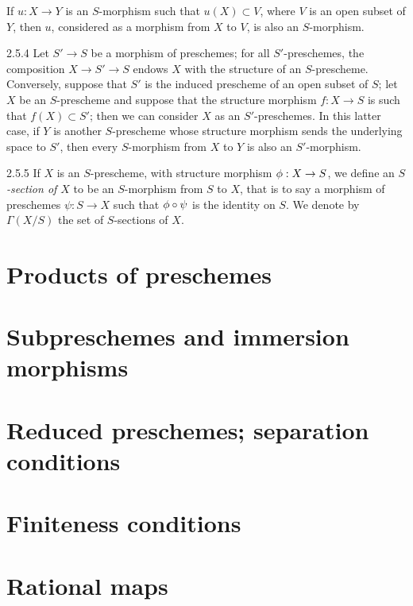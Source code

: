 If $u:X\to Y$ is an $S$-morphism such that $u(X)\subset V$, where $V$ is
an open subset of $Y$, then $u$, considered as a morphism from $X$ to $V$, is
also an $S$-morphism.

\begin{env}{2.5.4}
\label{env-1.2.5.4}
Let $S'\to S$ be a morphism of preschemes; for all
$S'$-preschemes, the composition $X\to S'\to S$ endows $X$ with the structure of
an $S$-prescheme. Conversely, suppose that $S'$ is the induced prescheme of an
open subset of $S$; let $X$ be an $S$-prescheme and suppose that the structure
morphism $f:X\to S$ is such that $f(X)\subset S'$; then we can consider
$X$ as an $S'$-preschemes. In this latter case, if $Y$ is another $S$-prescheme
whose structure morphism sends the underlying space to $S'$, then every
$S$-morphism from $X$ to $Y$ is also an $S'$-morphism.
\end{env}

\begin{env}{2.5.5}
\label{env-1.2.5.5}
If $X$ is an $S$-prescheme, with structure morphism
$\phi:X\to S$, we define an \emph{$S$-section of $X$} to be an
$S$-morphism from $S$ to $X$, that is to say a morphism of preschemes
$\psi:S\to X$ such that $\phi\circ\psi$ is the identity on $S$.  We
denote by $\Gamma(X/S)$ the set of $S$-sections of $X$.
\end{env}

\section{Products of preschemes}
\label{1-schemes-3}

\section{Subpreschemes and immersion morphisms}
\label{1-schemes-4}

\section{Reduced preschemes; separation conditions}
\label{1-schemes-5}

\section{Finiteness conditions}
\label{1-schemes-6}

\section{Rational maps}
\label{1-schemes-7}

